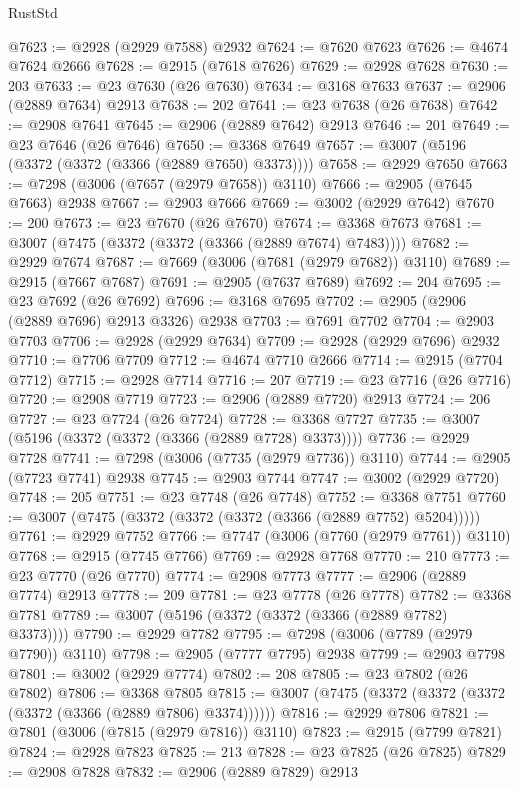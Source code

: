 \begin{lexlean}{RustStd}
\begin{coremodule}
@7623 := @2928 (@2929 @7588) @2932
@7624 := @7620 @7623
@7626 := @4674 @7624 @2666
@7628 := @2915 (@7618 @7626)
@7629 := @2928 @7628
@7630 := 203
@7633 := @23 @7630 (@26 @7630)
@7634 := @3168 @7633
@7637 := @2906 (@2889 @7634) @2913
@7638 := 202
@7641 := @23 @7638 (@26 @7638)
@7642 := @2908 @7641
@7645 := @2906 (@2889 @7642) @2913
@7646 := 201
@7649 := @23 @7646 (@26 @7646)
@7650 := @3368 @7649
@7657 := @3007 (@5196 (@3372 (@3372 (@3366 (@2889 @7650) @3373))))
@7658 := @2929 @7650
@7663 := @7298 (@3006 (@7657 (@2979 @7658)) @3110)
@7666 := @2905 (@7645 @7663) @2938
@7667 := @2903 @7666
@7669 := @3002 (@2929 @7642)
@7670 := 200
@7673 := @23 @7670 (@26 @7670)
@7674 := @3368 @7673
@7681 := @3007 (@7475 (@3372 (@3372 (@3366 (@2889 @7674) @7483))))
@7682 := @2929 @7674
@7687 := @7669 (@3006 (@7681 (@2979 @7682)) @3110)
@7689 := @2915 (@7667 @7687)
@7691 := @2905 (@7637 @7689)
@7692 := 204
@7695 := @23 @7692 (@26 @7692)
@7696 := @3168 @7695
@7702 := @2905 (@2906 (@2889 @7696) @2913 @3326) @2938
@7703 := @7691 @7702
@7704 := @2903 @7703
@7706 := @2928 (@2929 @7634)
@7709 := @2928 (@2929 @7696) @2932
@7710 := @7706 @7709
@7712 := @4674 @7710 @2666
@7714 := @2915 (@7704 @7712)
@7715 := @2928 @7714
@7716 := 207
@7719 := @23 @7716 (@26 @7716)
@7720 := @2908 @7719
@7723 := @2906 (@2889 @7720) @2913
@7724 := 206
@7727 := @23 @7724 (@26 @7724)
@7728 := @3368 @7727
@7735 := @3007 (@5196 (@3372 (@3372 (@3366 (@2889 @7728) @3373))))
@7736 := @2929 @7728
@7741 := @7298 (@3006 (@7735 (@2979 @7736)) @3110)
@7744 := @2905 (@7723 @7741) @2938
@7745 := @2903 @7744
@7747 := @3002 (@2929 @7720)
@7748 := 205
@7751 := @23 @7748 (@26 @7748)
@7752 := @3368 @7751
@7760 := @3007 (@7475 (@3372 (@3372 (@3372 (@3366 (@2889 @7752) @5204)))))
@7761 := @2929 @7752
@7766 := @7747 (@3006 (@7760 (@2979 @7761)) @3110)
@7768 := @2915 (@7745 @7766)
@7769 := @2928 @7768
@7770 := 210
@7773 := @23 @7770 (@26 @7770)
@7774 := @2908 @7773
@7777 := @2906 (@2889 @7774) @2913
@7778 := 209
@7781 := @23 @7778 (@26 @7778)
@7782 := @3368 @7781
@7789 := @3007 (@5196 (@3372 (@3372 (@3366 (@2889 @7782) @3373))))
@7790 := @2929 @7782
@7795 := @7298 (@3006 (@7789 (@2979 @7790)) @3110)
@7798 := @2905 (@7777 @7795) @2938
@7799 := @2903 @7798
@7801 := @3002 (@2929 @7774)
@7802 := 208
@7805 := @23 @7802 (@26 @7802)
@7806 := @3368 @7805
@7815 := @3007 (@7475 (@3372 (@3372 (@3372 (@3372 (@3366 (@2889 @7806) @3374))))))
@7816 := @2929 @7806
@7821 := @7801 (@3006 (@7815 (@2979 @7816)) @3110)
@7823 := @2915 (@7799 @7821)
@7824 := @2928 @7823
@7825 := 213
@7828 := @23 @7825 (@26 @7825)
@7829 := @2908 @7828
@7832 := @2906 (@2889 @7829) @2913

\end{coremodule}
\end{lexlean}
